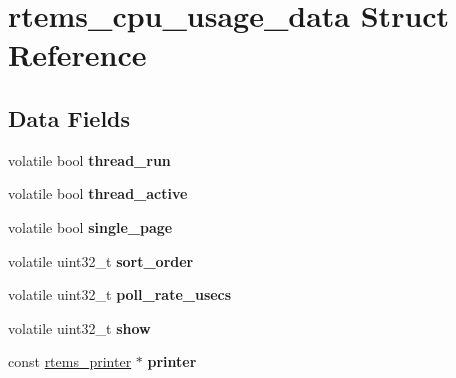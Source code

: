 \hypertarget{structrtems__cpu__usage__data}{}\section{rtems\+\_\+cpu\+\_\+usage\+\_\+data Struct Reference}
\label{structrtems__cpu__usage__data}
\subsection*{Data Fields}
\begin{DoxyCompactItemize}
\item 
\mbox{\label{structrtems__cpu__usage__data_ab8b6a65f02511d150fd5875a1cd9c82d}} 
volatile bool {\bfseries thread\+\_\+run}
\item 
\mbox{\label{structrtems__cpu__usage__data_a2532b1b7b522063d6592012700d37ff1}} 
volatile bool {\bfseries thread\+\_\+active}
\item 
\mbox{\label{structrtems__cpu__usage__data_ac79923e24171e3eabdf6b3b356c3e7df}} 
volatile bool {\bfseries single\+\_\+page}
\item 
\mbox{\label{structrtems__cpu__usage__data_a257fe2b130894bc2d13d9db78efd9072}} 
volatile uint32\+\_\+t {\bfseries sort\+\_\+order}
\item 
\mbox{\label{structrtems__cpu__usage__data_a0f3fef8af667043b41ab5dbc41349b08}} 
volatile uint32\+\_\+t {\bfseries poll\+\_\+rate\+\_\+usecs}
\item 
\mbox{\label{structrtems__cpu__usage__data_a3aa5af785c15d00c56f7c6ac9a3f57a0}} 
volatile uint32\+\_\+t {\bfseries show}
\item 
\mbox{\label{structrtems__cpu__usage__data_a930aac32c823e34b01f185077a31fb7f}} 
const \mbox{\hyperlink{structrtems__printer}{rtems\+\_\+printer}} $\ast$ {\bfseries printer}
\item 
\mbox{\label{structrtems__cpu__usage__data_afa9a762e68002345d6bcf78604b17edf}} 

\end{DoxyCompactItemize}
